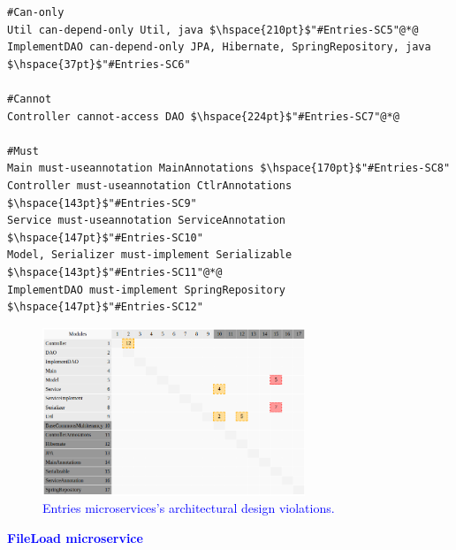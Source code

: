 \documentclass[12pt]{article}
\begin{document}
\begin{lstlisting}[style=colorido, caption={ \textcolor{blue}{Entries microservice's architectural design specification.}},label={list:especArquiteturalEntries}
]
#Can-only
Util can-depend-only Util, java	$\hspace{210pt}$"#Entries-SC5"@*@
ImplementDAO can-depend-only JPA, Hibernate, SpringRepository, java	$\hspace{37pt}$"#Entries-SC6"

#Cannot
Controller cannot-access DAO $\hspace{224pt}$"#Entries-SC7"@*@

#Must
Main must-useannotation MainAnnotations	$\hspace{170pt}$"#Entries-SC8"
Controller must-useannotation CtlrAnnotations $\hspace{143pt}$"#Entries-SC9"
Service must-useannotation ServiceAnnotation $\hspace{147pt}$"#Entries-SC10"
Model, Serializer must-implement Serializable $\hspace{143pt}$"#Entries-SC11"@*@
ImplementDAO must-implement SpringRepository $\hspace{147pt}$"#Entries-SC12"

\end{lstlisting}
\begin{figure}[ht]
\centering
\includegraphics[width=0.7\textwidth]{figuras/violacoesEntries.png}
\caption{\textcolor{blue}{Entries microservices's architectural design violations.}}
\label{fig:microservices}
\end{figure}


\newpage
\noindent\textbf{\large{\textcolor{blue}{FileLoad microservice}}}
\label{sec:ApendiceFileLoad}
\end{document}
